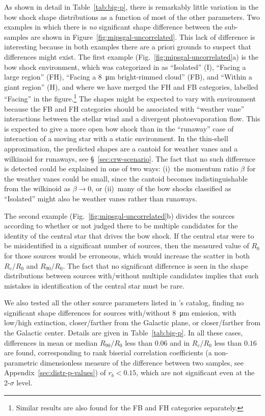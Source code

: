 As shown in detail in Table~\ref{tab:big-p}, there is remarkably
little variation in the bow shock shape distributions as a function of
most of the other parameters.  Two examples in which there is
\textit{no} significant shape difference between the sub-samples are
shown in Figure~\ref{fig:mipsgal-uncorrelated}.  This lack of
difference is interesting because in both examples there are a priori
grounds to suspect that differences might exist.  The first example (Fig.~\ref{fig:mipsgal-uncorrelated}a) is
the bow shock environment, which was categorized in
\citet{Kobulnicky:2016a} as ``Isolated'' (I), ``Facing a large \hii{}
region'' (FH), ``Facing a \SI{8}{\um} bright-rimmed cloud'' (FB), and
``Within a giant \hii{} region'' (H), and where we have merged the FH
and FB categories, labelled ``Facing'' in the figure.\footnote{Similar
  results are also found for the FB and FH categories separately.}
The shapes might be expected to vary with environment because the FB
and FH categories should be associated with ``weather vane''
interactions \citep{Povich:2008a} between the stellar wind and a
divergent photoevaporation flow.  This is expected to give a more open
bow shock than in the ``runaway'' case of interaction of a moving star
with a static environment.  In the thin-shell approximation, the
predicted shapes are a cantoid for weather vanes and a wilkinoid
for runaways, see \S~\ref{sec:crw-scenario}.  The fact that no such
difference is detected could be explained in one of two ways: (i)~the
momentum ratio \(\beta\) for the weather vanes could be small, since the
cantoid becomes indistinguishable from the wilkinoid as
\(\beta \to 0\), or (ii)~many of the bow shocks classified as ``Isolated''
might also be weather vanes rather than runaways.

The second example (Fig.~\ref{fig:mipsgal-uncorrelated}b) divides the
sources according to whether or not \citet{Kobulnicky:2016a} judged
there to be multiple candidates for the identity of the central star
that drives the bow shock.  If the central star were to be
misidentified in a significant number of sources, then the measured
value of \(R_0\) for those sources would be erroneous, which would
increase the scatter in both \(R_c/R_0\) and \(R_{90}/R_0\).  The
fact that no significant difference is seen in the shape distributions
between sources with/without multiple candidates implies that such
mistakes in identification of the central star must be rare.

We also tested all the other source parameters listed in
\citeauthor{Kobulnicky:2016a}'s catalog, finding no significant shape
differences for sources with/without \SI{8}{\um} emission, with
low/high extinction, closer/farther from the Galactic plane, or
closer/farther from the Galactic center. Details are given in
Table~\ref{tab:big-p}.  In all these cases, differences in mean or
median \(R_{90}/R_0\) less than \(0.06\) and in \(R_c/R_0\) less than
\(0.16\) are found, corresponding to rank biserial correlation
coefficients (a non-parametric dimensionless measure of the difference
between two samples, see Appendix~\ref{sec:distr-p-values}) of
\(r_b < 0.15\), which are not significant even at the 2-\(\sigma\) level.

